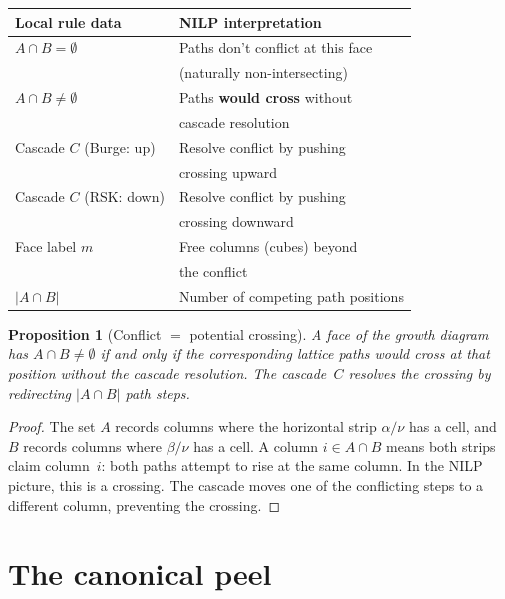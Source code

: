 \documentclass[11pt]{article}
\theoremstyle{plain}
\newtheorem{proposition}[theorem]{Proposition}
\theoremstyle{definition}
\begin{document}
\begin{center}
\begin{tabular}{l|l}
\textbf{Local rule data} &
  \textbf{NILP interpretation} \\ \hline
$A \cap B = \emptyset$ &
  Paths don't conflict at this face \\
  & (naturally non-intersecting) \\
$A \cap B \neq \emptyset$ &
  Paths \textbf{would cross} without \\
  & cascade resolution \\
Cascade $C$ (Burge: up) &
  Resolve conflict by pushing \\
  & crossing upward \\
Cascade $C$ (RSK: down) &
  Resolve conflict by pushing \\
  & crossing downward \\
Face label $m$ &
  Free columns (cubes) beyond \\
  & the conflict \\
$|A \cap B|$ &
  Number of competing path positions
\end{tabular}
\end{center}

\begin{proposition}[Conflict $=$ potential crossing]
\label{prop:conflict}
A face of the growth diagram has $A \cap B \neq \emptyset$
if and only if the corresponding lattice paths would cross
at that position without the cascade resolution.  The
cascade~$C$ resolves the crossing by redirecting
$|A \cap B|$ path steps.
\end{proposition}

\begin{proof}
The set $A$ records columns where the horizontal strip
$\alpha / \nu$ has a cell, and $B$ records columns where
$\beta / \nu$ has a cell.  A column $i \in A \cap B$
means both strips claim column~$i$: both paths attempt
to rise at the same column.  In the NILP picture, this
is a crossing.  The cascade moves one of the conflicting
steps to a different column, preventing the crossing.
\end{proof}


\section{The canonical peel}
\label{sec:canonical-peel}
\end{document}

